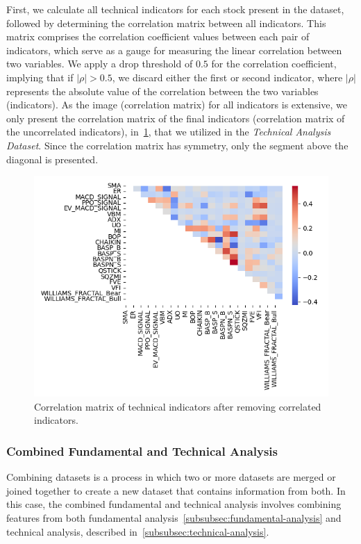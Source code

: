 \documentclass[../xlapes02]{subfiles}
\begin{document}
    First, we calculate all technical indicators for each stock present in the dataset, followed by determining the correlation matrix between all indicators. This matrix comprises the correlation coefficient values between each pair of indicators, which serve as a gauge for measuring the linear correlation between two variables. We apply a drop threshold of $0.5$ for the correlation coefficient, implying that if $|\rho| > 0.5$, we discard either the first or second indicator, where $|\rho|$ represents the absolute value of the correlation between the two variables (indicators). As the image (correlation matrix) for all indicators is extensive, we only present the correlation matrix of the final indicators (correlation matrix of the uncorrelated indicators), in~\cref{fig:ta_correlation_matrix_uncorrelated_indicators}, that we utilized in the \emph{Technical Analysis Dataset}. Since the correlation matrix has symmetry, only the segment above the diagonal is presented.
    \begin{figure}[h]
        \includegraphics[width=0.95\linewidth]{image/ta_correlation_matrix_uncorrelated_indicators}
        \centering
        \caption{Correlation matrix of technical indicators after removing correlated indicators.}
        \label{fig:ta_correlation_matrix_uncorrelated_indicators}
    \end{figure}

    \subsubsection{Combined Fundamental and Technical Analysis}\label{subsubsec:combined-fundamental-and-technical-analysis}
    Combining datasets is a process in which two or more datasets are merged or joined together to create a new dataset that contains information from both. In this case, the combined fundamental and technical analysis involves combining features from both fundamental analysis~\cref{subsubsec:fundamental-analysis} and technical analysis, described in~\cref{subsubsec:technical-analysis}.
\end{document}
